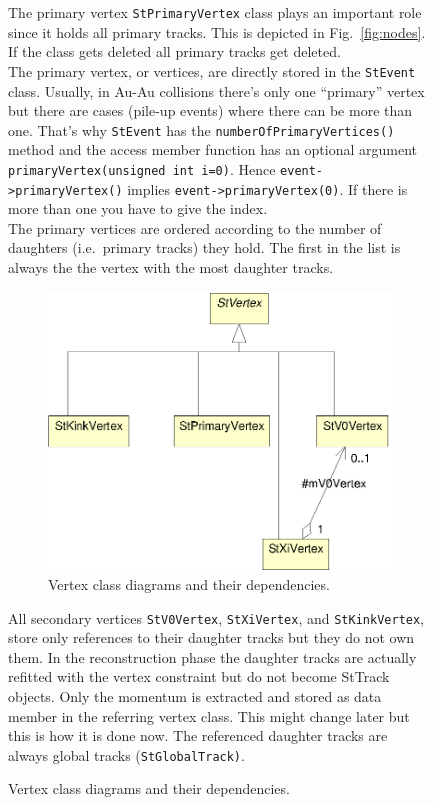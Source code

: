 \documentclass[twoside]{article}
\begin{document}
\begin{figure}[htb]
\begin{center}
The primary vertex \texttt{StPrimaryVertex} class plays an important
role since it holds all primary tracks. This is depicted in
Fig.~\ref{fig:nodes}. If the
class gets deleted all primary tracks get deleted. \\
The primary vertex, or vertices, are directly stored in the
\texttt{StEvent} class. Usually, in Au-Au collisions there's only one
``primary'' vertex but there are cases (pile-up events) where there
can be more than one.  That's why \texttt{StEvent} has the
\texttt{numberOfPrimaryVertices()} method and the access member
function has an optional argument \texttt{primaryVertex(unsigned int
    i=0)}.  Hence \texttt{event->primaryVertex()} implies
\texttt{event->primaryVertex(0)}. If there is more than one you have
to give the index.\\
The primary vertices are ordered according to the number of daughters
(i.e.~primary tracks) they hold. The first in the list is always the
the vertex with the most daughter tracks. 
\begin{figure}[htb]
    \begin{center}
        \includegraphics{vertex.eps}
        \caption{Vertex class diagrams and their dependencies.}
        \label{fig:vertex}
    \end{center}
\end{figure}

All secondary vertices \texttt{StV0Vertex}, \texttt{StXiVertex}, and
\texttt{StKinkVertex}, store only references to their daughter tracks
but they do not own them. In the reconstruction phase the daughter
tracks are actually refitted with the vertex constraint but do not
become StTrack objects. Only the momentum is extracted and stored as
data member in the referring vertex class. This might change later but
this is how it is done now. The referenced daughter tracks are always
global tracks (\texttt{StGlobalTrack)}.


\end{center}
\end{figure}
\end{document}

